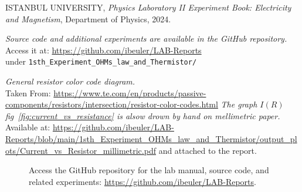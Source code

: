\documentclass[journal]{IEEEtran}
\begin{document}
\begin{thebibliography}{9}

    ISTANBUL UNIVERSITY, 
    \textit{Physics Laboratory II Experiment Book: Electricity and Magnetism}, 
    Department of Physics, 2024.

    \textit{Source code and additional experiments are available in the GitHub repository.} \\ 
    Access it at: \url{https://github.com/ibeuler/LAB-Reports} \\
    under \texttt{1sth\_Experiment\_OHMs\_law\_and\_Thermistor/}

    \textit{General resistor color code diagram.}\\
    Taken From: \url{https://www.te.com/en/products/passive-components/resistors/intersection/resistor-color-codes.html}
    \textit{The graph $I(R)$ fig~\ref{fig:current_vs_resistance} is alsow drown by hand on mellimetric paper.}\\
    Available at: \url{https://github.com/ibeuler/LAB-Reports/blob/main/1sth_Experiment_OHMs_law_and_Thermistor/output_plots/Current_vs_Resistor_millimetric.pdf}
    and attached to the report.
\end{thebibliography}

\begin{figure}[H]
    \centering
    \begin{minipage}{0.15\textwidth}
        \centering
    \end{minipage}%
    \begin{minipage}{0.2\textwidth}
        \raggedright
        \caption{Access the GitHub repository for the lab manual, source code, and related experiments: \href{https://github.com/ibeuler/LAB-Reports}{\url{https://github.com/ibeuler/LAB-Reports}}.}
    \end{minipage}
    \label{fig:qr}
\end{figure}
\end{document}
